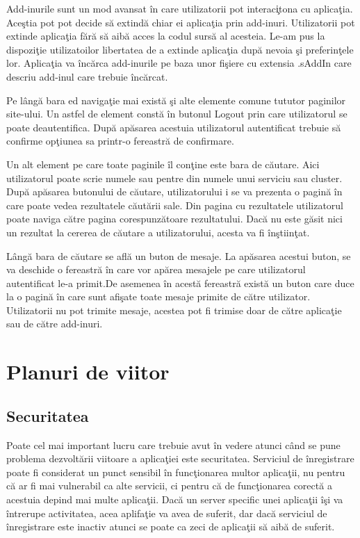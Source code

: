 \documentclass[a4paper,12pt]{report}
\begin{document}
Add-inurile sunt un mod avansat \^in care utilizatorii pot interac\c itona cu aplica\c tia. Ace\c stia 
pot pot decide s\u a extind\u a chiar ei aplica\c tia prin add-inuri. Utilizatorii pot extinde aplica\c tia 
f\u ar\u a s\u a aib\u a acces la codul surs\u a al acesteia. Le-am pus la dispozi\c tie utilizatoilor libertatea de a extinde 
aplica\c tia dup\u a nevoia \c si preferin\c tele lor. Aplica\c tia va \^inc\u arca add-inurile pe baza unor 
fi\c siere cu extensia .sAddIn care descriu add-inul care trebuie \^inc\u arcat.

Pe l\^ang\u a bara ed naviga\c tie mai exist\u a \c si alte elemente comune 
tututor paginilor site-ului. Un astfel de element const\u a \^in butonul Logout 
prin care utilizatorul se poate deautentifica. Dup\u a ap\u asarea acestuia 
utilizatorul autentificat trebuie s\u a confirme op\c tiunea sa printr-o 
fereastr\u a de confirmare.

Un alt element pe care toate paginile \^il con\c tine este bara de c\u autare.
Aici utilizatorul poate scrie numele sau pentre din numele unui serviciu sau cluster.
Dup\u a ap\u asarea butonului de c\u autare, utilizatorului i se va prezenta o pagin\u a 
\^in care poate vedea rezultatele c\u aut\u arii sale. Din pagina cu rezultatele 
utilizatorul poate naviga c\u atre pagina corespunz\u atoare rezultatului.
Dac\u a nu este g\u asit nici un rezultat la cererea de c\u autare a utilizatorului,
acesta va fi \^in\c stiin\c tat.

L\^ang\u a bara de c\u autare se afl\u a un buton de mesaje. La ap\u asarea acestui buton,
se va deschide o fereastr\u a \^in care vor ap\u area mesajele pe care utilizatorul 
autentificat le-a primit.De asemenea \^in acest\u a fereastr\u a exist\u a un buton care 
duce la o pagin\u a \^in care sunt afi\c sate toate mesaje primite de c\u atre utilizator.
Utilizatorii nu pot trimite mesaje, acestea pot fi trimise doar de c\u atre aplica\c tie sau de 
c\u atre add-inuri.

\chapter{Planuri de viitor}

\section{Securitatea}

Poate cel mai important lucru care trebuie avut \^in vedere atunci c\^and se pune problema  
dezvolt\u arii viitoare a aplica\c tiei este securitatea. Serviciul de \^inregistrare 
poate fi considerat un punct sensibil \^in func\c tionarea multor aplica\c tii, nu pentru c\u a 
ar fi mai vulnerabil ca alte servicii, ci pentru c\u a de func\c tionarea corect\u a a acestuia 
depind mai multe aplica\c tii. Dac\u a un server specific unei aplica\c tii \^i\c si va \^intrerupe 
activitatea, acea aplifa\c tie va avea de suferit, dar dac\u a serviciul de \^inregistrare este inactiv 
atunci se poate ca zeci de aplica\c tii s\u a aib\u a de suferit. 
\end{document}
